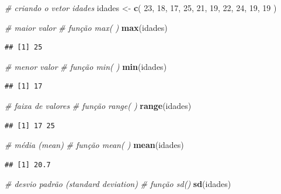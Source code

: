 \documentclass[
]{book}
\newenvironment{Shaded}{\begin{snugshade}}{\end{snugshade}}
\newcommand{\CommentTok}[1]{\textcolor[rgb]{0.56,0.35,0.01}{\textit{#1}}}
\newcommand{\DecValTok}[1]{\textcolor[rgb]{0.00,0.00,0.81}{#1}}
\newcommand{\FunctionTok}[1]{\textcolor[rgb]{0.13,0.29,0.53}{\textbf{#1}}}
\newcommand{\NormalTok}[1]{#1}
\newcommand{\OtherTok}[1]{\textcolor[rgb]{0.56,0.35,0.01}{#1}}
\begin{document}
\begin{Shaded}
\begin{Highlighting}[]
\CommentTok{\# criando o vetor idades }
\NormalTok{idades }\OtherTok{\textless{}{-}} \FunctionTok{c}\NormalTok{( }\DecValTok{23}\NormalTok{, }\DecValTok{18}\NormalTok{, }\DecValTok{17}\NormalTok{, }\DecValTok{25}\NormalTok{, }\DecValTok{21}\NormalTok{, }\DecValTok{19}\NormalTok{, }\DecValTok{22}\NormalTok{, }\DecValTok{24}\NormalTok{, }\DecValTok{19}\NormalTok{, }\DecValTok{19}\NormalTok{ )}

\CommentTok{\# maior valor}
\CommentTok{\# função max( )}
\FunctionTok{max}\NormalTok{(idades)}
\end{Highlighting}
\end{Shaded}

\begin{verbatim}
## [1] 25
\end{verbatim}

\begin{Shaded}
\begin{Highlighting}[]
\CommentTok{\# menor valor}
\CommentTok{\# função min( )}
\FunctionTok{min}\NormalTok{(idades)}
\end{Highlighting}
\end{Shaded}

\begin{verbatim}
## [1] 17
\end{verbatim}

\begin{Shaded}
\begin{Highlighting}[]
\CommentTok{\# faixa de valores}
\CommentTok{\# função range( )}
\FunctionTok{range}\NormalTok{(idades)}
\end{Highlighting}
\end{Shaded}

\begin{verbatim}
## [1] 17 25
\end{verbatim}

\begin{Shaded}
\begin{Highlighting}[]
\CommentTok{\# média (mean)}
\CommentTok{\# função mean( )}
\FunctionTok{mean}\NormalTok{(idades)}
\end{Highlighting}
\end{Shaded}

\begin{verbatim}
## [1] 20.7
\end{verbatim}

\begin{Shaded}
\begin{Highlighting}[]
\CommentTok{\# desvio padrão (standard deviation)}
\CommentTok{\# função sd() }
\FunctionTok{sd}\NormalTok{(idades)}
\end{Highlighting}
\end{Shaded}
\end{document}
